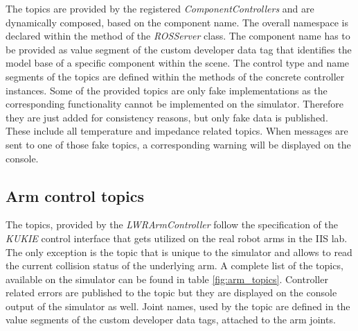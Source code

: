 The topics are provided by the registered \emph{ComponentControllers} and are dynamically composed, based on the component name. The overall namespace is declared within the  method of the \emph{ROSServer} class. The component name has to be provided as value segment of the custom developer data tag that identifies the model base of a specific component within the scene. The control type and name segments of the topics are defined within the  methods of the concrete controller instances. Some of the provided topics are only fake implementations as the corresponding functionality cannot be implemented on the simulator. Therefore they are just added for consistency reasons, but only fake data is published. These include all temperature and impedance related topics. When messages are sent to one of those fake topics, a corresponding warning will be displayed on the console.

\subsection{Arm control topics}

The topics, provided by the \emph{LWRArmController} follow the specification of the \emph{KUKIE} control interface that gets utilized on the real robot arms in the IIS lab. The only exception is the  topic that is unique to the simulator and allows to read the current collision status of the underlying arm. A complete list of the topics, available on the simulator can be found in table \ref{fig:arm_topics}. Controller related errors are published to the  topic but they are displayed on the console output of the simulator as well. Joint names, used by the  topic are defined in the value segments of the custom developer data tags, attached to the arm joints.


